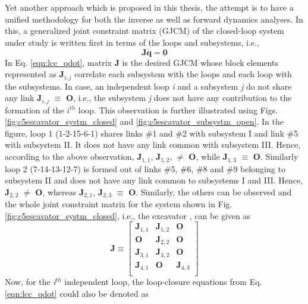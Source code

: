 {Yet another approach which is proposed in this thesis, the attempt is to have a unified methodology for both the inverse as well as forward dynamics analyses. In this, a generalized joint constraint matrix (GJCM) of the closed-loop system under study is written first in terms of the loops and subsystems, i.e., 
\begin{equation}
\label{eqn:lcc_qdot}
\textbf{J$\dot{\textbf{q}}$} = \textbf{0} 
\end{equation}
In Eq. \ref{eqn:lcc_qdot}, matrix \textbf{J} is the desired GJCM whose block elements represented as \textbf{J}$_{i,j}$ correlate each subsystem with the loops and each loop with the subsystems. In case, an independent loop \textit{i} and a subsystem \textit{j} do not share any link \textbf{J$_{i,j}$} $\equiv$ \textbf{O}, i.e., the subsystem \emph{j} does not have any contribution to the formation of the $i^{th}$ loop. This observation is further illustrated using Figs. \ref{fig:c5escavator_systm_closed} and \ref{fig:c5escavator_subsystm_open}. In the figure, loop 1 (1-2-15-6-1) shares links \#1 and \#2 with subsystem I and link \#5 with subsystem II. It does not have any link common with subsystem III. Hence, according to the above observation, \textbf{J$_{1,1}$}, \textbf{J$_{1,2}$}, $\neq$ \textbf{O}, while \textbf{J$_{1,3}$} $\equiv$ \textbf{O}. Similarly loop 2 (7-14-13-12-7) is formed out of links \#5, \#6, \#8 and \#9 belonging to subsystem II and does not have any link common to subsystems I and III. Hence, \textbf{J$_{2,2}$} $\neq$ \textbf{O}, whereas \textbf{J$_{2,1}$}, \textbf{J$_{2,3}$} $\equiv$ \textbf{O}. Similarly, the others can be observed and the whole joint constraint matrix for the system shown in Fig. \ref{fig:c5escavator_systm_closed}, i.e., the excavator \citep{janssen2005multiloop}, can be given as
	\begin{equation}
	\label{eqn:J_escav}
	\mathbf{J}\equiv
	\left[ \begin{array}{ccc}
	\textbf{J$_{1,1}$} & \textbf{J$_{1,2}$} & \textbf{O} \\
	\textbf{O} & \textbf{J$_{2,2}$} & \textbf{O} \\
	\textbf{J$_{3,1}$} & \textbf{J$_{3,2}$} & \textbf{O} \\
	\textbf{J$_{4,1}$} & \textbf{O} & \textbf{J$_{4,3}$} \\
	\end{array} \right]
	\end{equation}
Now, for the \textit{i$^{th}$} independent loop, the loop-closure equations from Eq. \ref{eqn:lcc_qdot} could also be denoted as 
}
